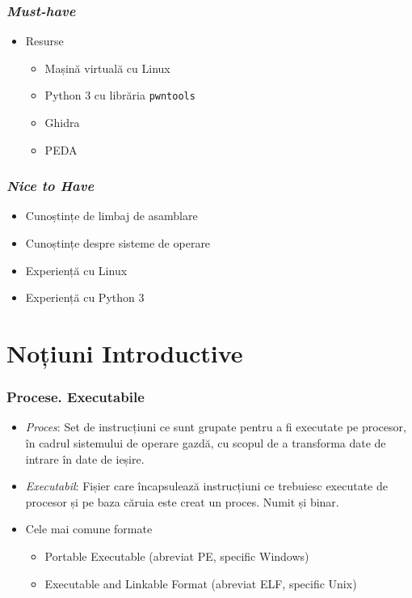 \documentclass[xcolor={table}]{beamer}
\begin{document}
	\begin{frame}
		\frametitle{\textit{Must-have}}\pause
		\begin{itemize}[<+->]
		    \item Resurse
		        \begin{itemize}
    				\item Mașină virtuală cu Linux
    				\item Python 3 cu librăria \texttt{pwntools}
    				\item Ghidra
    				\item PEDA
		        \end{itemize}
		\end{itemize}
	\end{frame}
	
	\begin{frame}
		\frametitle{\textit{Nice to Have}}\pause
		\begin{itemize}[<+->]
			\item Cunoștințe de limbaj de asamblare
			\item Cunoștințe despre sisteme de operare
			\item Experiență cu Linux
			\item Experiență cu Python 3
		\end{itemize}
	\end{frame}
	
	\section{Noțiuni Introductive}
	
	\begin{frame}
		\frametitle{Procese. Executabile}\pause
		\begin{itemize}[<+->]
		    \item \textit{Proces}: Set de instrucțiuni ce sunt grupate pentru a fi executate pe procesor, în cadrul sistemului de operare gazdă, cu scopul de a transforma date de intrare în date de ieșire.
			\item \textit{Executabil}: Fișier care încapsulează instrucțiuni ce trebuiesc executate de procesor și pe baza căruia este creat un proces. Numit și binar.
			\item Cele mai comune formate
			    \begin{itemize}
        			\item Portable Executable (abreviat PE, specific Windows)
        			\item Executable and Linkable Format (abreviat ELF, specific Unix)
        		\end{itemize}
		\end{itemize}
	\end{frame}
	
\end{document}
